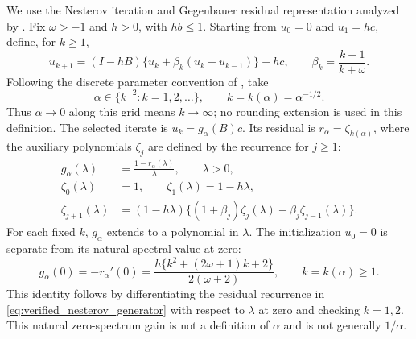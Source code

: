\documentclass[11pt,a4paper,leqno]{article}
\numberwithin{equation}{section}
\numberwithin{figure}{section}
\numberwithin{table}{section}
\theoremstyle{plain}
\theoremstyle{definition}
\theoremstyle{remark}
\begin{document}
We use the Nesterov iteration and Gegenbauer residual representation
analyzed by \citet[Theorem~1]{kindermann2021optimal}.
Fix $\omega>-1$ and $h>0$, with $hb\leq1$.
Starting from $u_0=0$ and $u_1=hc$, define, for $k\geq1$,
\begin{equation}\label{eq:verified_nesterov_iteration}
 u_{k+1}=(I-hB)\{u_k+\beta_k(u_k-u_{k-1})\}+hc,
 \qquad \beta_k=\frac{k-1}{k+\omega}.
\end{equation}
Following the discrete parameter convention of \citet[Example~10]{wang2025debiasing}, take
\[
 \alpha\in\{k^{-2}:k=1,2,\ldots\},\qquad k=k(\alpha)=\alpha^{-1/2}.
\]
Thus $\alpha\to0$ along this grid means $k\to\infty$; no rounding extension is used in this definition. The selected iterate is $u_k=g_\alpha(B)c$. Its residual is $r_\alpha=\zeta_{k(\alpha)}$, where the auxiliary polynomials $\zeta_j$ are defined by the recurrence for $j\geq1$:
\begin{equation}\label{eq:verified_nesterov_generator}
 \begin{split}
 g_\alpha(\lambda)&=\frac{1-r_\alpha(\lambda)}{\lambda},\qquad \lambda>0,\\
 \zeta_0(\lambda)&=1,\qquad \zeta_1(\lambda)=1-h\lambda,\\
 \zeta_{j+1}(\lambda)&=(1-h\lambda)\{(1+\beta_j)\zeta_j(\lambda)-\beta_j\zeta_{j-1}(\lambda)\}.
 \end{split}
\end{equation}
For each fixed $k$, $g_\alpha$ extends to a polynomial in $\lambda$. The initialization $u_0=0$ is separate from its natural spectral value at zero:
\begin{equation}\label{eq:verified_nesterov_zero_gain}
 g_\alpha(0)=-r_\alpha'(0)=
 \frac{h\{k^2+(2\omega+1)k+2\}}{2(\omega+2)},\qquad k=k(\alpha)\geq1.
\end{equation}
This identity follows by differentiating the residual recurrence in
\eqref{eq:verified_nesterov_generator} with respect to $\lambda$ at zero and checking $k=1,2$. This natural zero-spectrum gain is not a definition of $\alpha$ and is not generally $1/\alpha$.
\end{document}
